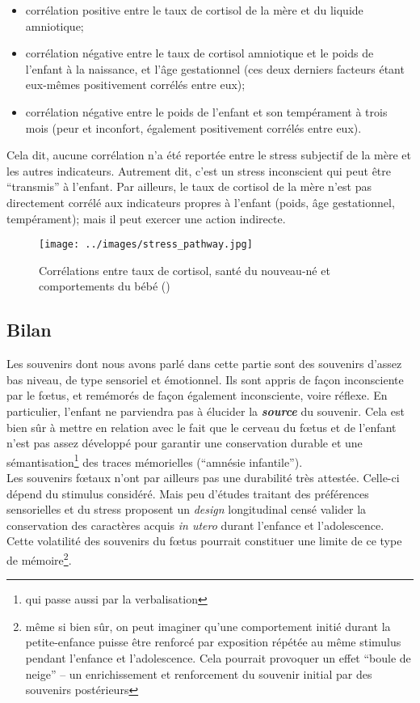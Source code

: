 \documentclass[french]{article}
\begin{document}
				\begin{itemize}
					\item corrélation positive entre le taux de cortisol de la mère et du liquide amniotique;
					\item corrélation négative entre le taux de cortisol amniotique et le poids de l'enfant à la naissance, et l'âge gestationnel (ces deux derniers facteurs étant eux-mêmes positivement corrélés entre eux);
					\item corrélation négative entre le poids de l'enfant et son tempérament à trois mois (peur et inconfort, également positivement corrélés entre eux).
				\end{itemize}\vspace{3mm}
				Cela dit, aucune corrélation n'a été reportée entre le stress subjectif de la mère et les autres indicateurs. Autrement dit, c'est un stress inconscient qui peut être ``transmis'' à l'enfant. Par ailleurs, le taux de cortisol de la mère n'est pas directement corrélé aux indicateurs propres à l'enfant (poids, âge gestationnel, tempérament); mais il peut exercer une action indirecte.
				\begin{figure}[H]
					\centering
					\texttt{[image: ../images/stress\_pathway.jpg]}
					\caption{Corrélations entre taux de cortisol, santé du nouveau-né et comportements du bébé (\cite{baibazarova2013})}
				\end{figure}
			
			\subsection{Bilan}
				Les souvenirs dont nous avons parlé dans cette partie sont des souvenirs d'assez bas niveau, de type sensoriel et émotionnel. Ils sont appris de façon inconsciente par le fœtus, et remémorés de façon également inconsciente, voire réflexe. En particulier, l'enfant ne parviendra pas à élucider la \textit{\textbf{source}} du souvenir. Cela est bien sûr à mettre en relation avec le fait que le cerveau du fœtus et de l'enfant n'est pas assez développé pour garantir une conservation durable et une sémantisation\footnote{qui passe aussi par la verbalisation} des traces mémorielles (``amnésie infantile'').\\
				Les souvenirs fœtaux n'ont par ailleurs pas une durabilité très attestée. Celle-ci dépend du stimulus considéré. Mais peu d'études traitant des préférences sensorielles et du stress proposent un \textit{design} longitudinal censé valider la conservation des caractères acquis \textit{in utero} durant l'enfance et l'adolescence. Cette volatilité des souvenirs du fœtus pourrait constituer une limite de ce type de mémoire\footnote{ même si bien sûr, on peut imaginer qu'une comportement initié durant la petite-enfance puisse être renforcé par exposition répétée au même stimulus pendant l'enfance et l'adolescence. Cela pourrait provoquer un effet ``boule de neige'' -- un enrichissement et renforcement du souvenir initial par des souvenirs postérieurs}.
				
\end{document}
